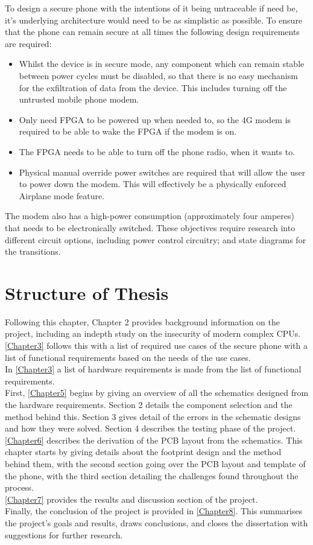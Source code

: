 To design a secure phone with the intentions of it being untraceable if need be, it’s underlying architecture would need to be as simplistic as possible.
To ensure that the phone can remain secure at all times the following design requirements are required:
\begin{itemize}
\item Whilst the device is in secure mode, any component which can remain stable between power cycles must be disabled, so that there is no easy mechanism for the exfiltration of data from the device.
  This includes turning off the untrusted mobile phone modem. 
\item Only need FPGA to be powered up when needed to, so the 4G modem is required to be able to wake the FPGA if the modem is on.
\item The FPGA needs to be able to turn off the phone radio, when it wants to.
\item Physical manual override power switches are required that will allow the user to power down the modem. This will effectively be a physically enforced Airplane mode feature. 
\end{itemize}
The modem also has a high-power consumption (approximately four amperes) that needs to be electronically switched.
These objectives require research into different circuit options, including power control circuitry; and state diagrams for the transitions.

\section{Structure of Thesis}

Following this chapter, Chapter 2 provides background information on the project, including an indepth study on the insecurity of modern complex CPUs.\\ 
\ref{Chapter3} follows this with a list of required use cases of the secure phone with a list of functional requirements based on the needs of the use cases.\\ 
In \ref{Chapter3} a list of hardware requirements is made from the list of functional requirements.\\
First, \ref{Chapter5} begins by giving an overview of all the schematics designed from the hardware requirements.
Section 2 details the component selection and the method behind this.
Section 3 gives detail of the errors in the schematic designs and how they were solved.
Section 4 describes the testing phase of the project.\\
\ref{Chapter6} describes the derivation of the PCB layout from the schematics.
This chapter starts by giving details about the footprint design and the method behind them, with the second section going over the PCB layout and template of the phone, with the third section detailing the challenges found throughout the process.\\
\ref{Chapter7} provides the results and discussion section of the project.\\
Finally, the conclusion of the project is provided in \ref{Chapter8}.
This summarises the project's goals and results, draws conclusions, and closes the dissertation with suggestions for further research.
